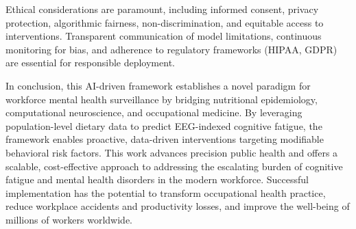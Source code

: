 \documentclass[journal,twoside,10pt]{IEEEtran}
\begin{document}
Ethical considerations are paramount, including informed consent, privacy protection, algorithmic fairness, non-discrimination, and equitable access to interventions. Transparent communication of model limitations, continuous monitoring for bias, and adherence to regulatory frameworks (HIPAA, GDPR) are essential for responsible deployment.

In conclusion, this AI-driven framework establishes a novel paradigm for workforce mental health surveillance by bridging nutritional epidemiology, computational neuroscience, and occupational medicine. By leveraging population-level dietary data to predict EEG-indexed cognitive fatigue, the framework enables proactive, data-driven interventions targeting modifiable behavioral risk factors. This work advances precision public health and offers a scalable, cost-effective approach to addressing the escalating burden of cognitive fatigue and mental health disorders in the modern workforce. Successful implementation has the potential to transform occupational health practice, reduce workplace accidents and productivity losses, and improve the well-being of millions of workers worldwide.




\end{document}
